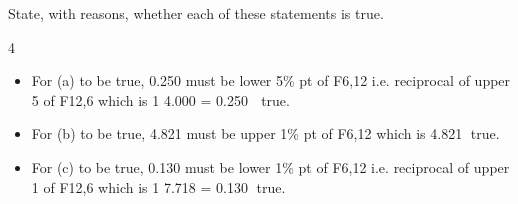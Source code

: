 \documentclass[a4paper,12pt]{article}
\begin{document}
\begin{enumerate}
State, with reasons, whether each of these statements is true. 


4 
\begin{itemize}
\item For (a) to be true, 0.250 must be lower 5\% pt of F6,12 i.e. reciprocal of upper 5%
of F12,6 which is
1
4.000
= 0.250  true.
    \item For (b) to be true, 4.821 must be upper 1\% pt of F6,12 which is 4.821 true.
\item For (c) to be true, 0.130 must be lower 1\% pt of F6,12 i.e. reciprocal of upper 1%
of F12,6 which is
1
7.718
= 0.130 true.

\end{itemize}

\newpage
 
\end{enumerate}





\end{document}
